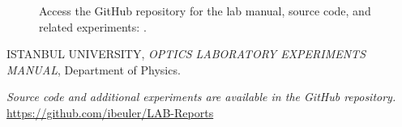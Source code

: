 \documentclass[journal]{IEEEtran}
\begin{document}
\begin{figure}[H]
    \centering
    \begin{minipage}{0.15\textwidth}
        \centering
    \end{minipage}%
    \begin{minipage}{0.2\textwidth}
        \raggedright
        \caption{Access the GitHub repository for the lab manual, source code, and related experiments: \cite{github}.}
        \label{fig:qr_code}
    \end{minipage}
\end{figure}

\begin{thebibliography}{9}
    ISTANBUL UNIVERSITY, \textit{OPTICS LABORATORY EXPERIMENTS MANUAL}, Department of Physics.

    \textit{Source code and additional experiments are available in the GitHub repository.} \url{https://github.com/ibeuler/LAB-Reports}
\end{thebibliography}
\end{document}
